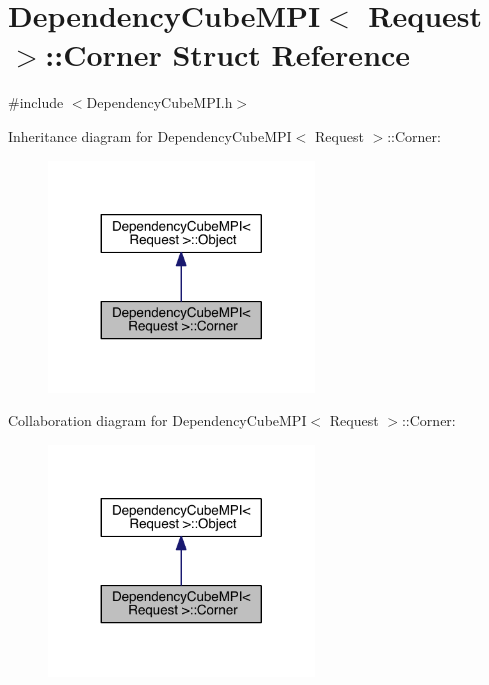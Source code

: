 \hypertarget{struct_dependency_cube_m_p_i_1_1_corner}{}\section{Dependency\+Cube\+M\+P\+I$<$ Request $>$\+:\+:Corner Struct Reference}
\label{struct_dependency_cube_m_p_i_1_1_corner}


{\ttfamily \#include $<$Dependency\+Cube\+M\+P\+I.\+h$>$}



Inheritance diagram for Dependency\+Cube\+M\+P\+I$<$ Request $>$\+:\+:Corner\+:\nopagebreak
\begin{figure}[H]
\begin{center}
\leavevmode
\includegraphics[width=200pt]{db/daf/struct_dependency_cube_m_p_i_1_1_corner__inherit__graph}
\end{center}
\end{figure}


Collaboration diagram for Dependency\+Cube\+M\+P\+I$<$ Request $>$\+:\+:Corner\+:\nopagebreak
\begin{figure}[H]
\begin{center}
\leavevmode
\includegraphics[width=200pt]{d3/df4/struct_dependency_cube_m_p_i_1_1_corner__coll__graph}
\end{center}
\end{figure}
